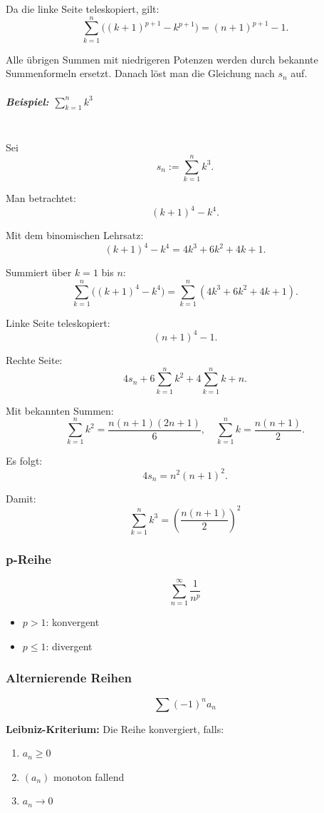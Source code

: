 \documentclass[../zusammenfassung_AN.tex]{subfiles}
\begin{document}
	Da die linke Seite teleskopiert, gilt:
	\[
	\sum_{k=1}^n \big((k+1)^{p+1} - k^{p+1}\big) = (n+1)^{p+1}-1.
	\]
	
	Alle übrigen Summen mit niedrigeren Potenzen werden durch bekannte Summenformeln ersetzt. Danach löst man die Gleichung nach \(s_n\) auf.
	
	\subparagraph{Beispiel: \(\sum_{k=1}^n k^3\)}\mbox{}\\
	
	Sei
	\[
	s_n := \sum_{k=1}^n k^3.
	\]
	
	Man betrachtet:
	\[
	(k+1)^4 - k^4.
	\]
	
	Mit dem binomischen Lehrsatz:
	\[
	(k+1)^4 - k^4 = 4k^3 + 6k^2 + 4k + 1.
	\]
	
	Summiert über \(k=1\) bis \(n\):
	\[
	\sum_{k=1}^n \big((k+1)^4 - k^4\big)
	=
	\sum_{k=1}^n (4k^3 + 6k^2 + 4k + 1).
	\]
	
	Linke Seite teleskopiert:
	\[
	(n+1)^4 - 1.
	\]
	
	Rechte Seite:
	\[
	4s_n
	+ 6\sum_{k=1}^n k^2
	+ 4\sum_{k=1}^n k
	+ n.
	\]
	
	Mit bekannten Summen:
	\[
	\sum_{k=1}^n k^2 = \frac{n(n+1)(2n+1)}{6}, \quad
	\sum_{k=1}^n k = \frac{n(n+1)}{2}.
	\]
	
	Es folgt:
	\[
	4s_n = n^2(n+1)^2.
	\]
	
	Damit:
	\[
	\boxed{
		\sum_{k=1}^n k^3 = \left(\frac{n(n+1)}{2}\right)^2
	}
	\]
	
	\subsubsection{p-Reihe}
	\[
	\sum_{n=1}^{\infty} \frac{1}{n^p}
	\]
	
	\begin{itemize}
		\item $p>1$: konvergent
		\item $p \le 1$: divergent
	\end{itemize}
	
	\subsubsection{Alternierende Reihen}
	\[
	\sum (-1)^n a_n
	\]
	
	\textbf{Leibniz-Kriterium:}  
	Die Reihe konvergiert, falls:
	\begin{enumerate}
		\item $a_n \ge 0$
		\item $(a_n)$ monoton fallend
		\item $a_n \to 0$
	\end{enumerate}
	
\end{document}

